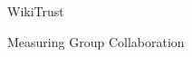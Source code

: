 \vspace*{\fill}
\begin{center}
\HUGE\textsf{WikiTrust}\par
\end{center}
\begin{center}
\LARGE\textsf{Measuring Group Collaboration}\par
\end{center}
\vspace*{\fill}
